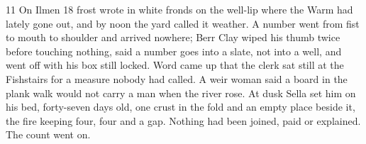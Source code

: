 \begin{CRchronicle}{11}
On Ilmen 18 frost wrote in white fronds on the well-lip where the Warm had lately gone out, and by noon the yard called it weather. A number went from fist to mouth to shoulder and arrived nowhere; Berr Clay wiped his thumb twice before touching nothing, said a number goes into a slate, not into a well, and went off with his box still locked. Word came up that the clerk sat still at the Fishstairs for a measure nobody had called. A weir woman said a board in the plank walk would not carry a man when the river rose. At dusk Sella set him on his bed, forty-seven days old, one crust in the fold and an empty place beside it, the fire keeping four, four and a gap. Nothing had been joined, paid or explained. The count went on.
\end{CRchronicle}
